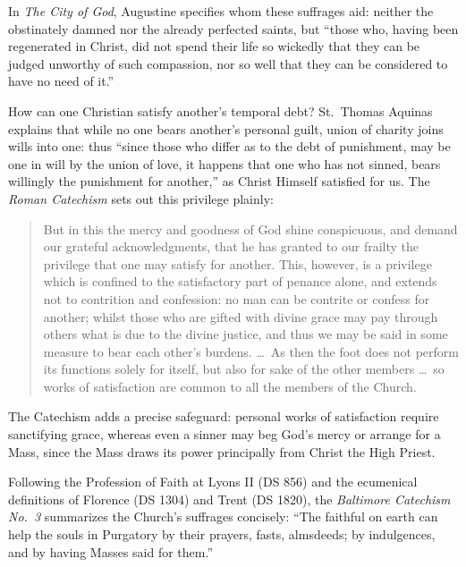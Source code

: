 In \textit{The City of God}, Augustine specifies whom these suffrages aid: neither the obstinately damned nor the already perfected saints, but ``those who, having been regenerated in Christ, did not spend their life so wickedly that they can be judged unworthy of such compassion, nor so well that they can be considered to have no need of it.''

How can one Christian satisfy another's temporal debt? St.\ Thomas Aquinas explains that while no one bears another's personal guilt, union of charity joins wills into one: thus ``since those who differ as to the debt of punishment, may be one in will by the union of love, it happens that one who has not sinned, bears willingly the punishment for another,'' as Christ Himself satisfied for us. The \textit{Roman Catechism} sets out this privilege plainly:

\begin{quote}
But in this the mercy and goodness of God shine conspicuous, and demand our grateful acknowledgments, that he has granted to our frailty the privilege that one may satisfy for another. This, however, is a privilege which is confined to the satisfactory part of penance alone, and extends not to contrition and confession: no man can be contrite or confess for another; whilst those who are gifted with divine grace may pay through others what is due to the divine justice, and thus we may be said in some measure to bear each other's burdens. \dots\ As then the foot does not perform its functions solely for itself, but also for sake of the other members \dots\ so works of satisfaction are common to all the members of the Church.
\end{quote}

The Catechism adds a precise safeguard: personal works of satisfaction require sanctifying grace, whereas even a sinner may beg God's mercy or arrange for a Mass, since the Mass draws its power principally from Christ the High Priest.

Following the Profession of Faith at Lyons II (DS 856) and the ecumenical definitions of Florence (DS 1304) and Trent (DS 1820), the \textit{Baltimore Catechism No.\ 3} summarizes the Church's suffrages concisely: ``The faithful on earth can help the souls in Purgatory by their prayers, fasts, almsdeeds; by indulgences, and by having Masses said for them.''


